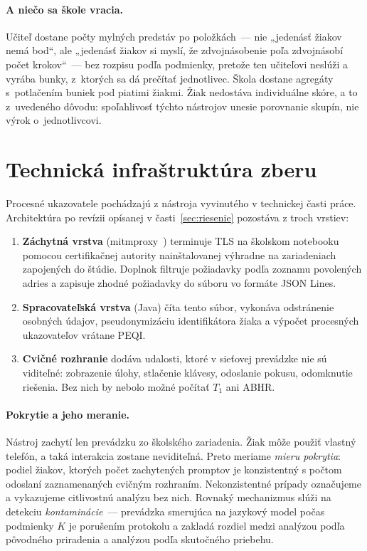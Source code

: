 \paragraph{A niečo sa škole vracia.} Učiteľ dostane počty mylných predstáv po položkách~--- nie „jedenásť žiakov nemá bod“, ale „jedenásť žiakov si myslí, že zdvojnásobenie poľa zdvojnásobí počet krokov“~--- bez rozpisu podľa podmienky, pretože ten učiteľovi neslúži a vyrába bunky, z~ktorých sa dá prečítať jednotlivec. Škola dostane agregáty s~potlačením buniek pod piatimi žiakmi. Žiak nedostáva individuálne skóre, a to z~uvedeného dôvodu: spoľahlivosť týchto nástrojov unesie porovnanie skupín, nie výrok o~jednotlivcovi.

\section{Technická infraštruktúra zberu}
\label{sec:infrastruktura}

Procesné ukazovatele pochádzajú z nástroja vyvinutého v technickej časti práce. Architektúra po revízii opísanej v časti~\ref{sec:riesenie} pozostáva z troch vrstiev:

\begin{enumerate}[nosep]
    \item \textbf{Záchytná vrstva} (mitmproxy~\cite{mitmproxy}) terminuje TLS na školskom notebooku pomocou certifikačnej autority nainštalovanej výhradne na zariadeniach zapojených do štúdie. Doplnok filtruje požiadavky podľa zoznamu povolených adries a zapisuje zhodné požiadavky do súboru vo formáte JSON Lines.
    \item \textbf{Spracovateľská vrstva} (Java) číta tento súbor, vykonáva odstránenie osobných údajov, pseudonymizáciu identifikátora žiaka a výpočet procesných ukazovateľov vrátane PEQI.
    \item \textbf{Cvičné rozhranie} dodáva udalosti, ktoré v sieťovej prevádzke nie sú viditeľné: zobrazenie úlohy, stlačenie klávesy, odoslanie pokusu, odomknutie riešenia. Bez nich by nebolo možné počítať $T_1$ ani ABHR.
\end{enumerate}

\paragraph{Pokrytie a jeho meranie.} Nástroj zachytí len prevádzku zo školského zariadenia. Žiak môže použiť vlastný telefón, a taká interakcia zostane neviditeľná. Preto meriame \emph{mieru pokrytia}: podiel žiakov, ktorých počet zachytených promptov je konzistentný s počtom odoslaní zaznamenaných cvičným rozhraním. Nekonzistentné prípady označujeme a vykazujeme citlivostnú analýzu bez nich. Rovnaký mechanizmus slúži na detekciu \emph{kontaminácie}~--- prevádzka smerujúca na jazykový model počas podmienky $K$ je porušením protokolu a zakladá rozdiel medzi analýzou podľa pôvodného priradenia a analýzou podľa skutočného priebehu.

